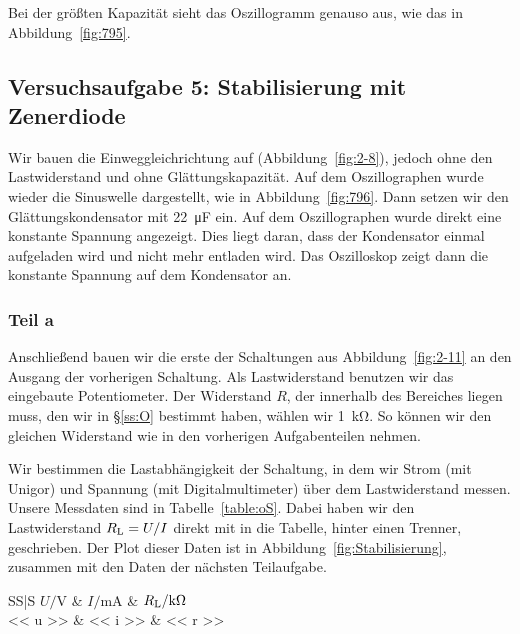 Bei der größten Kapazität sieht das Oszillogramm genauso aus, wie das in
Abbildung~\ref{fig:795}.

\FloatBarrier
\subsection{Versuchsaufgabe 5: Stabilisierung mit Zenerdiode}

Wir bauen die Einweggleichrichtung auf (Abbildung~\ref{fig:2-8}), jedoch ohne
den Lastwiderstand und ohne Glättungskapazität. Auf dem Oszillographen wurde
wieder die Sinuswelle dargestellt, wie in Abbildung~\ref{fig:796}. Dann setzen
wir den Glättungskondensator mit \SI{22}{\micro\farad} ein. Auf dem
Oszillographen wurde direkt eine konstante Spannung angezeigt. Dies liegt
daran, dass der Kondensator einmal aufgeladen wird und nicht mehr entladen
wird. Das Oszilloskop zeigt dann die konstante Spannung auf dem Kondensator an.

\subsubsection{Teil a}

Anschließend bauen wir die erste der Schaltungen aus Abbildung~\ref{fig:2-11}
an den Ausgang der vorherigen Schaltung. Als Lastwiderstand benutzen wir das
eingebaute Potentiometer. Der Widerstand $R$, der innerhalb des Bereiches
liegen muss, den wir in §\ref{ss:O} bestimmt haben, wählen wir
\SI{1}{\kilo\ohm}. So können wir den gleichen Widerstand wie in den vorherigen
Aufgabenteilen nehmen.

Wir bestimmen die Lastabhängigkeit der Schaltung, in dem wir Strom (mit
Unigor) und Spannung (mit Digitalmultimeter) über dem Lastwiderstand messen.
Unsere Messdaten sind in Tabelle~\ref{table:oS}. Dabei haben wir den
Lastwiderstand $R_\text L = U / I$ direkt mit in die Tabelle, hinter einen
Trenner, geschrieben. Der Plot dieser Daten ist in
Abbildung~\ref{fig:Stabilisierung}, zusammen mit den Daten der nächsten
Teilaufgabe.

\begin{table}[htbp]
	\centering
	\caption{%
		Messdaten ohne Stabilisierung
	}
	\label{table:oS}
	\begin{tabular}{SS|S}
		{$U / \si\volt$} & {$I / \si{\milli\ampere}$} & {$R_\text L / \si{\kilo\ohm}$} \\
		\hline
		<< u >> & << i >> & << r >> \\
	\end{tabular}
\end{table}


